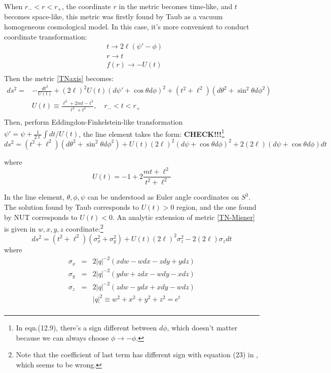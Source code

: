 \documentclass[12pt, a4paper]{article}
\numberwithin{equation}{section}
\newcommand{\be}{\begin{equation}}
\newcommand{\ee}{\end{equation}}
\begin{document}
When $r_- < r < r_+$, the coordinate $r$ in the metric becomes time-like, and $t$ becomes space-like, this metric was firstly found by Taub\cite{Taub:1951gm} as a vacuum homogeneous cosmological model. In this case, it's more convenient to conduct coordinate transformation:
\be
\begin{aligned}
	&t\rightarrow 2\ell(\psi' - \phi)\\
	&r\rightarrow t\\
	&f(r) \rightarrow -U(t)\\
\end{aligned}
\ee
Then the metric \ref{TNaxis} becomes:
\be
\begin{aligned}
	ds^2 = &-\frac{dt^2}{U(t)} + (2\ell)^2U(t)(d\psi' +\cos\theta d\phi)^2 + (t^2 + \ell^2)(d\theta^2 + \sin^2\theta d\phi^2)&\\
	&U(t) \equiv \frac{\ell^2 + 2mt - t^2}{\ell^2 + t^2},\quad r_- < t < r_+&\\
\end{aligned}
\ee
Then, perform Eddingdon-Finkelstein-like transformation $\psi' = \psi + \frac{1}{2\ell}\int dt/U(t)$, the line element takes the form:\textbf{   CHECK!!!}\footnote{In \cite{Griffiths:2009gr} eqn.(12.9), there's a sign different between $d\phi$, which doesn't matter because we can always choose $\phi \rightarrow -\phi$.}\cite{Misner:1965aa}\cite{Griffiths:2009gr}	
\be
ds^2 = (t^2 + \ell^2)(d\theta^2+\sin^2\theta d\phi^2) + U(t)(2\ell)^2(d\psi+\cos\theta d\phi)^2+2(2\ell)(d\psi+\cos\theta d\phi)dt
\label{TN-Misner}
\ee

where
\be
U(t) = -1 + 2\frac{mt+\ell^2}{t^2+\ell^2}
\ee

In the line element, $\theta, \phi, \psi$ can be understood as Euler angle coordinates on $S^3$.\cite{Calin:2000ss} The solution found by Taub corresponds to $U(t)>0$ region, and the one found by NUT corresponds to $U(t)<0$. An analytic extension of metric \ref{TN-Misner} is given in $w,x,y,z$ coordinate:\footnote{Note that the coefficient of last term has different sign with equation (23) in \cite{Misner:1965aa}, which seems to be wrong.}\cite{Misner:1965aa}
\be
ds^2 = (t^2+\ell^2)(\sigma_x^2+\sigma_y^2)+U(t)(2\ell)^2\sigma_z^2 - 2(2\ell)\sigma_z dt
\label{maximalTN}
\ee
where
\be
\begin{aligned}
	\sigma_x &=& 2|q|^{-2}(xdw-wdx-zdy+ydz)\\
	\sigma_y &=& 2|q|^{-2}(ydw + zdx - wdy - xdz)\\
	\sigma_z &=& 2|q|^{-2}(zdw - ydx + xdy -wdz)\\
	&&|q|^2 \equiv w^2 + x^2 + y^2 + z^2 = e^t\\
\end{aligned}
\ee
\end{document}
